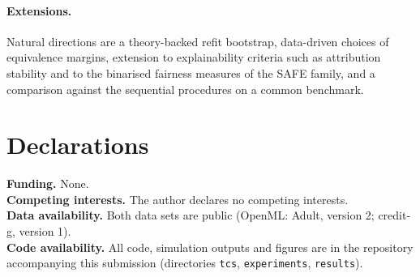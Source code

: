 \documentclass[11pt,a4paper]{article}
\begin{document}
\paragraph{Extensions.} Natural directions are a theory-backed refit bootstrap, data-driven choices of equivalence margins, extension to explainability criteria such as attribution stability and to the binarised fairness measures of the SAFE family, and a comparison against the sequential procedures on a common benchmark.

\section*{Declarations}
\noindent\textbf{Funding.} None.\\
\textbf{Competing interests.} The author declares no competing interests.\\
\textbf{Data availability.} Both data sets are public (OpenML: Adult, version 2; credit-g, version 1).\\
\textbf{Code availability.} All code, simulation outputs and figures are in the repository accompanying this submission (directories \texttt{tcs}, \texttt{experiments}, \texttt{results}).
\end{document}
